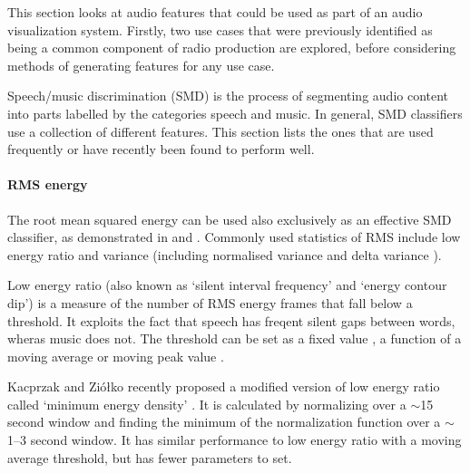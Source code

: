 

This section looks at audio features that could be used as part of an audio visualization system. Firstly, two use
cases that were previously identified as being a common component of radio production are explored, before considering
methods of generating features for any use case.

Speech/music discrimination (SMD) is the process of segmenting audio content into parts labelled by the categories
speech and music. In general, SMD classifiers use a collection of different features. This section lists the ones that
are used frequently or have recently been found to perform well.

\paragraph{RMS energy}
The root mean squared energy can be used also exclusively as an effective SMD classifier, as demonstrated in
\citep{Ericsson2009} and \citep{Panagiotakis2005}.  Commonly used statistics of RMS include low energy ratio
\citep{Liang2005,Ericsson2009,Saunders1996,Scheirer1997} and variance \citep{Ericsson2009} (including normalised
variance \citep{Panagiotakis2005} and delta variance \citep{Carey1999}).

Low energy ratio (also known as `silent interval frequency' and `energy contour dip') is a measure of the number of RMS
energy frames that fall below a threshold. It exploits the fact that speech has freqent silent gaps between words,
wheras music does not. The threshold can be set as a fixed value \citep{Liang2005}, a function of a moving average
\citep{Ericsson2009} or moving peak value \citep{Saunders1996}.

Kacprzak and Zi\'{o}\l{}ko recently proposed a modified version of low energy ratio called `minimum energy density'
\citep{Kacprzak2013}. It is calculated by normalizing over a $\sim$15 second window and finding the minimum of the
normalization function over a $\sim$1--3 second window. It has similar performance to low energy ratio with a moving
average threshold, but has fewer parameters to set.

